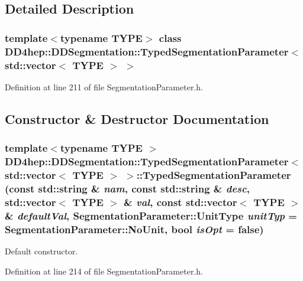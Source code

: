 \subsection{Detailed Description}
\subsubsection*{template$<$typename TYPE$>$ class DD4hep::DDSegmentation::TypedSegmentationParameter$<$ std::vector$<$ TYPE $>$ $>$}



Definition at line 211 of file SegmentationParameter.h.

\subsection{Constructor \& Destructor Documentation}
\hypertarget{class_d_d4hep_1_1_d_d_segmentation_1_1_typed_segmentation_parameter_3_01std_1_1vector_3_01_t_y_p_e_01_4_01_4_a4deba5d43284deab4fba1c05f0cbb563}{
\subsubsection[{TypedSegmentationParameter}]{\setlength{\rightskip}{0pt plus 5cm}template$<$typename TYPE $>$ {\bf DD4hep::DDSegmentation::TypedSegmentationParameter}$<$ std::vector$<$ TYPE $>$ $>$::{\bf TypedSegmentationParameter} (const std::string \& {\em nam}, \/  const std::string \& {\em desc}, \/  std::vector$<$ TYPE $>$ \& {\em val}, \/  const std::vector$<$ TYPE $>$ \& {\em defaultVal}, \/  {\bf SegmentationParameter::UnitType} {\em unitTyp} = {\ttfamily SegmentationParameter::NoUnit}, \/  bool {\em isOpt} = {\ttfamily false})}}
\label{class_d_d4hep_1_1_d_d_segmentation_1_1_typed_segmentation_parameter_3_01std_1_1vector_3_01_t_y_p_e_01_4_01_4_a4deba5d43284deab4fba1c05f0cbb563}


Default constructor. 

Definition at line 214 of file SegmentationParameter.h.

